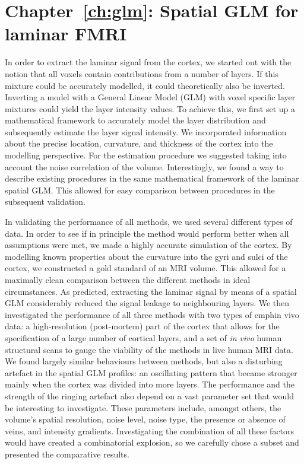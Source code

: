 \section*{Chapter~\ref{ch:glm}: Spatial GLM for laminar FMRI}
In order to extract the laminar signal from the cortex, we started out with the notion that all voxels contain contributions from a number of layers. If this mixture could be accurately modelled, it could theoretically also be inverted. Inverting a model with a General Linear Model (GLM) with voxel specific layer mixtures could yield the layer intensity values. To achieve this, we first set up a mathematical framework to accurately model the layer distribution and subsequently estimate the layer signal intensity. We incorporated information about the precise location, curvature, and thickness of the cortex into the modelling perspective. For the estimation procedure we suggested taking into account the noise correlation of the volume. Interestingly, we found a way to describe existing procedures in the same mathematical framework of the laminar spatial GLM. This allowed for easy comparison between procedures in the subsequent validation.

In validating the performance of all methods, we used several different types of data. In order to see if in principle the method would perform better when all assumptions were met, we made a highly accurate simulation of the cortex. By modelling known properties about the curvature into the gyri and sulci of the cortex, we constructed a gold standard of an MRI volume. This allowed for a maximally clean comparison between the different methods in ideal circumstances. As predicted, extracting the laminar signal by means of a spatial GLM considerably reduced the signal leakage to neighbouring layers. We then investigated the performance of all three methods with two types of 
emph{in vivo} data: a high-resolution (post-mortem) part of the cortex that allows for the specification of a large number of cortical layers, and a set of \emph{in vivo} human structural scans to gauge the viability of the methods in live human MRI data. We found largely similar behaviours between methods, but also a disturbing artefact in the spatial GLM profiles: an oscillating pattern that became stronger mainly when the cortex was divided into more layers. The performance and the strength of the ringing artefact also depend on a vast parameter set that would be interesting to investigate. These parameters include, amongst others, the volume’s spatial resolution, noise level, noise type, the presence or absence of veins, and intensity gradients. Investigating the combination of all these factors would have created a combinatorial explosion, so we carefully chose a subset and presented the comparative results.

